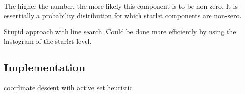 The higher the number, the more likely this component is to be non-zero. It is essentially a probability distribution for which starlet components are non-zero.

Stupid approach with line search. Could be done more efficiently by using the histogram of the starlet level.

\subsection{Implementation}
coordinate descent with active set heuristic

